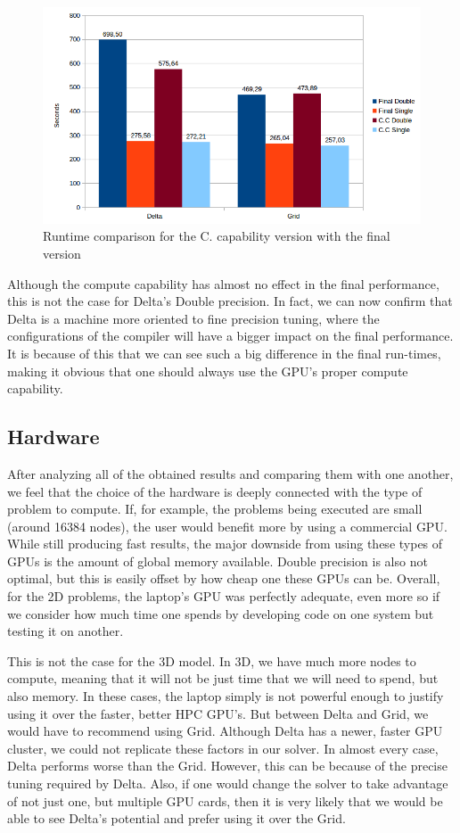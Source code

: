\documentclass[12pt]{book}
\begin{document}
  \begin{figure}[H]
  	\centering
  	\includegraphics[width=\linewidth]{Resources/Images/cc3d.png}
  	\caption{Runtime comparison for the C. capability version with the final version}
  	\label{fig:cc3d}
  \end{figure}
  
  Although the compute capability has almost no effect in the final performance, this is not the case for Delta's Double precision. In fact, we can now confirm that Delta is a machine more oriented to fine precision tuning, where the configurations of the compiler will have a bigger impact on the final performance. It is because of this that we can see such a big difference in the final run-times, making it obvious that one should always use the GPU's proper compute capability.

\subsection{Hardware}
After analyzing all of the obtained results and comparing them with one another, we feel that the choice of the hardware is deeply connected with the type of problem to compute. If, for example, the problems being executed are small (around 16384 nodes), the user would benefit more by using a commercial GPU. While still producing fast results, the major downside from using these types of GPUs is the amount of global memory available. Double precision is also not optimal, but this is easily offset by how cheap one these GPUs can be. Overall, for the 2D problems, the laptop's GPU was perfectly adequate, even more so if we consider how much time one spends by developing code on one system but testing it on another. \par
This is not the case for the 3D model. In 3D, we have much more nodes to compute, meaning that it will not be just time that we will need to spend, but also memory. In these cases, the laptop simply is not powerful enough to justify using it over the faster, better HPC GPU's. But between Delta and Grid, we would have to recommend using Grid. Although Delta has a newer, faster GPU cluster, we could not replicate these factors in our solver. In almost every case, Delta performs worse than the Grid. However, this can be because of the precise tuning required by Delta. Also, if one would change the solver to take advantage of not just one, but multiple GPU cards, then it is very likely that we would be able to see Delta's potential and prefer using it over the Grid.
\end{document}

